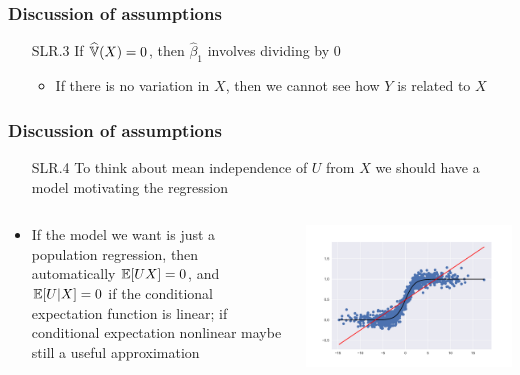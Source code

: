 \begin{frame}[allowframebreaks]
  \frametitle{Discussion of assumptions}
  \begin{itemize}
  \item[SLR.3] If $\widehat{\mathbb{V}}(X) = 0$, then 
    $\hat{\beta}_1$ involves dividing by $0$
    \begin{itemize}
    \item If there is no variation in $X$, then we cannot see how
      $Y$ is related to $X$
    \end{itemize}
  \end{itemize}
\end{frame}

\begin{frame}[allowframebreaks]
  \frametitle{Discussion of assumptions}
  \begin{itemize}
  \item[SLR.4] To think about mean independence of $U$ from $X$
    we should have a model motivating the regression
  \end{itemize}
  \begin{columns}[c] %
    \begin{column}{.48\textwidth}
      \begin{itemize}
      \item If the model we want is just a population regression,
        then automatically $\mathbb{E}[UX] = 0$, and $\mathbb{E}[U|X] =
        0$ if the conditional expectation function is linear; if
        conditional expectation nonlinear maybe still a useful
        approximation       
      \end{itemize}
    \end{column}
    \begin{column}{.48\textwidth}
      \includegraphics[width=\textwidth]{nonlinearCEF} \\
    \end{column}
  \end{columns}
\end{frame}

